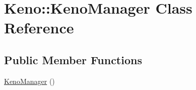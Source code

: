 \hypertarget{classKeno_1_1KenoManager}{}\section{Keno\+:\+:Keno\+Manager Class Reference}
\label{classKeno_1_1KenoManager}
\subsection*{Public Member Functions}
\begin{DoxyCompactItemize}
\item 
\hyperlink{classKeno_1_1KenoManager_a718c11b82d1e32c6d2496df94639e954}{Keno\+Manager} ()\hypertarget{classKeno_1_1KenoManager_a718c11b82d1e32c6d2496df94639e954}{}\label{classKeno_1_1KenoManager_a718c11b82d1e32c6d2496df94639e954}


\end{DoxyCompactItemize}
